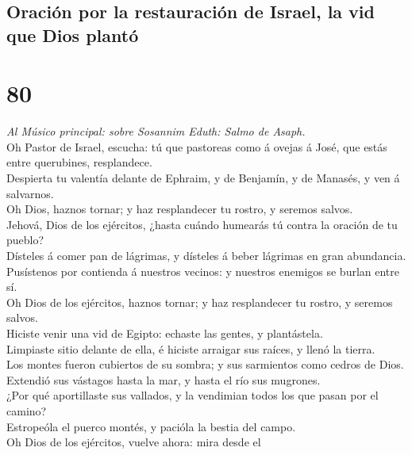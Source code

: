 \hypertarget{oraciuxf3n-por-la-restauraciuxf3n-de-israel-la-vid-que-dios-plantuxf3}{%
\subsection{Oración por la restauración de Israel, la vid que Dios
plantó}\label{oraciuxf3n-por-la-restauraciuxf3n-de-israel-la-vid-que-dios-plantuxf3}}

\hypertarget{section-79}{%
\section{80}\label{section-79}}

 \emph{Al Músico principal: sobre Sosannim Eduth: Salmo de
Asaph.}\\
Oh Pastor de Israel, escucha: tú que pastoreas como á ovejas á José, que
estás entre querubines, resplandece.\\
 Despierta tu valentía delante de Ephraim, y de Benjamín, y
de Manasés, y ven á salvarnos.\\
 Oh Dios, haznos tornar; y haz resplandecer tu rostro, y
seremos salvos.\\
 Jehová, Dios de los ejércitos, ¿hasta cuándo humearás tú
contra la oración de tu pueblo?\\
 Dísteles á comer pan de lágrimas, y dísteles á beber
lágrimas en gran abundancia.\\
 Pusístenos por contienda á nuestros vecinos: y nuestros
enemigos se burlan entre sí.\\
 Oh Dios de los ejércitos, haznos tornar; y haz resplandecer
tu rostro, y seremos salvos.\\
 Hiciste venir una vid de Egipto: echaste las gentes, y
plantástela.\\
 Limpiaste sitio delante de ella, é hiciste arraigar sus
raíces, y llenó la tierra.\\
 Los montes fueron cubiertos de su sombra; y sus sarmientos
como cedros de Dios.\\
 Extendió sus vástagos hasta la mar, y hasta el río sus
mugrones.\\
 ¿Por qué aportillaste sus vallados, y la vendimian todos
los que pasan por el camino?\\
 Estropeóla el puerco montés, y pacióla la bestia del
campo.\\
 Oh Dios de los ejércitos, vuelve ahora: mira desde el

